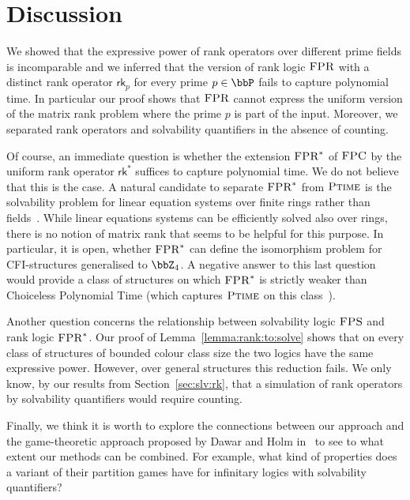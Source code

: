 \documentclass[a4paper,UKenglish]{lipics}
\newcommand{\Z}{\ensuremath{\bbZ}}
\newcommand{\logic}[1]{\ensuremath{\textsc{#1}}\xspace}
\newcommand{\FPC}{\logic{FPC}}
\newcommand{\FPRK}{\logic{FPR}}
\newcommand{\FPR}{\FPRK}
\newcommand{\FPS}{\ensuremath{\logic{FPS}}\xspace}
\newcommand{\FPRvar}{\ensuremath{\logic{FPR}^*}\xspace}
\newcommand{\rkp}{\ensuremath{\textsf{rk}_p}\xspace}
\newcommand{\rk}{\ensuremath{\textsf{rk}^*}\xspace}
\newcommand{\compclass}[1]{\ensuremath{\textsc{#1}}\xspace}
\newcommand{\PTIME}{\compclass{Ptime}}
\theoremstyle{plain}
\begin{document}
\section{Discussion}

We showed that the expressive power of rank operators over 
different prime fields is incomparable and we inferred that the version of rank 
logic \FPR with a distinct rank operator $\rkp$ for every prime $p \in \bbP$ 
fails to capture polynomial time.
In particular our proof shows that $\FPR$ cannot express the uniform version of 
the matrix rank problem where the prime $p$ is part of the input.
Moreover, we separated rank operators and solvability quantifiers in the 
absence of counting.

Of course, an immediate question is whether the extension $\FPRvar$ of 
$\FPC$ by the uniform rank operator $\rk$ suffices to capture polynomial time.
We do not believe that this is the case.
A natural candidate to separate $\FPRvar$ from $\PTIME$ is the solvability 
problem for linear equation systems over finite rings
rather than fields~\cite{DaGrHoKoPa13}.
While linear equations systems can be efficiently solved also over rings,
there is no notion of matrix rank that seems to be helpful for this purpose.
In particular, it is open, whether $\FPRvar$ can
define the isomorphism problem for CFI-structures 
generalised to $\Z_4$.
A negative answer to this last question would provide a class 
of structures on which $\FPRvar$ is strictly weaker than
Choiceless Polynomial Time (which captures $\PTIME$ on this 
class~\cite{AGGP14}).

Another question concerns the relationship between solvability 
logic $\FPS$ and rank logic $\FPRvar$. Our proof of 
Lemma~\ref{lemma:rank:to:solve} shows that on every class of structures of 
bounded colour class size the two logics have the same expressive power.
However, over general structures this reduction fails.
We only know, by our results from Section~\ref{sec:slv:rk}, that
a simulation of rank operators by solvability quantifiers would require
counting.

Finally, we think it is worth to explore the connections between our approach 
and the game-theoretic approach proposed by Dawar and Holm in~\cite{DaHo12} to 
see to what extent our methods can be combined. 
For example, what kind of properties does a variant of their partition games 
have for  infinitary logics with solvability quantifiers?




\end{document}
